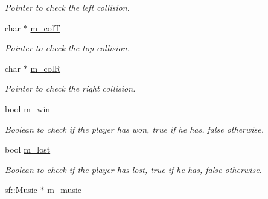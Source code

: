 \begin{DoxyCompactItemize}
\begin{DoxyCompactList}\small\item\em Pointer to check the left collision. \end{DoxyCompactList}\item 
\hypertarget{class_game_manager_a453919435a19f51aac53370ab1761dd5}{char $\ast$ \hyperlink{class_game_manager_a453919435a19f51aac53370ab1761dd5}{m\-\_\-col\-T}}\label{class_game_manager_a453919435a19f51aac53370ab1761dd5}

\begin{DoxyCompactList}\small\item\em Pointer to check the top collision. \end{DoxyCompactList}\item 
\hypertarget{class_game_manager_a0a9aa8ed8be6c9f8ff3c61ab72948bd9}{char $\ast$ \hyperlink{class_game_manager_a0a9aa8ed8be6c9f8ff3c61ab72948bd9}{m\-\_\-col\-R}}\label{class_game_manager_a0a9aa8ed8be6c9f8ff3c61ab72948bd9}

\begin{DoxyCompactList}\small\item\em Pointer to check the right collision. \end{DoxyCompactList}\item 
\hypertarget{class_game_manager_aef88fa7485663c973fe47350894441ee}{bool \hyperlink{class_game_manager_aef88fa7485663c973fe47350894441ee}{m\-\_\-win}}\label{class_game_manager_aef88fa7485663c973fe47350894441ee}

\begin{DoxyCompactList}\small\item\em Boolean to check if the player has won, true if he has, false otherwise. \end{DoxyCompactList}\item 
\hypertarget{class_game_manager_abd261afcb9a4f75c1a0fa1cd707a7c8f}{bool \hyperlink{class_game_manager_abd261afcb9a4f75c1a0fa1cd707a7c8f}{m\-\_\-lost}}\label{class_game_manager_abd261afcb9a4f75c1a0fa1cd707a7c8f}

\begin{DoxyCompactList}\small\item\em Boolean to check if the player has lost, true if he has, false otherwise. \end{DoxyCompactList}\item 
\hypertarget{class_game_manager_aa9ea92449084ccab8f3a7467b3a56524}{sf\-::\-Music $\ast$ \hyperlink{class_game_manager_aa9ea92449084ccab8f3a7467b3a56524}{m\-\_\-music}}\label{class_game_manager_aa9ea92449084ccab8f3a7467b3a56524}


\end{DoxyCompactItemize}
